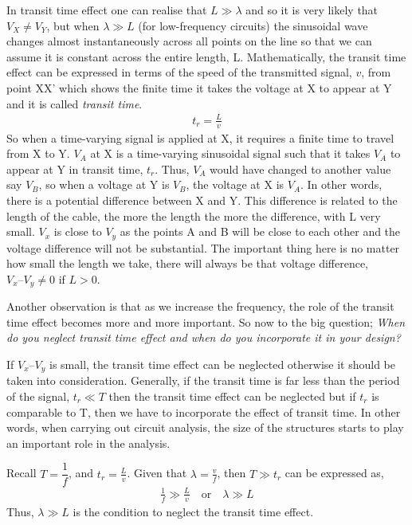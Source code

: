 In transit time effect one can realise that $ L \gg\lambda$ and so it is very likely that $ V_{X} \neq V_{Y} $, but when $  \lambda \gg L  $ (for low-frequency circuits) the sinusoidal wave changes almost instantaneously across all points on the line so that we can assume it is constant across the entire length, L. Mathematically, the transit time effect can be expressed in terms of the speed of the transmitted signal, $v$, from point XX' which shows the finite time it takes the voltage at X to appear at Y and it is called \textit{transit time}.
\begin{align}
t_{r} = \frac{L}{v}
\label{eqn:transittime}
\end{align}
So when a time-varying signal is applied at X, it requires a finite time to travel from X to Y. $ V_{A} $ at X is a time-varying sinusoidal signal such that it takes $ V_{A} $ to appear at Y in transit time, $t_r$. Thus, $ V_{A} $ would have changed to another value say $ V_{B} $, so when a voltage at Y is $ V_{B} $, the voltage at X is $ V_{A} $. In other words, there is a potential difference between X and Y. This difference is related to the length of the cable, the more the length the more the difference, with L very small. $ V_{x} $ is close to $ V_{y} $ as the points A and B will be close to each other and the voltage difference will not be substantial. The important thing here is no matter how small the length we take, there will always be that voltage difference, $ V_{x} – V_{y} \neq 0 $ if $ L > 0 $.

Another observation is that as we increase the frequency, the role of the transit time effect becomes more and more important. So now to the big question; \textit{When do you neglect transit time effect and when do you incorporate it in your design?}

If $ V_{x} – V_{y} $ is small, the transit time effect can be neglected otherwise it should be taken into consideration. Generally, if the transit time is far less than the period of the signal,  $ t_{r} \ll T $ then the  transit time effect can be neglected but if $ t_{r} $ is comparable to T, then we have to incorporate the effect of transit time. In other words, when carrying out circuit analysis, the size of the structures starts to play an important role in the analysis.

Recall $T = \dfrac{1}{f} $, and $t_{r} = \frac{L}{v}$. Given that $ \lambda = \frac{v}{f} $, then $T \gg t_r$ can be expressed as, 
\begin{align*}
\frac{1}{f} \gg \frac{L}{v}\quad\text{or}\quad\lambda \gg L
\end{align*}
Thus, $ \lambda \gg L $ is the condition to neglect the transit time effect.

